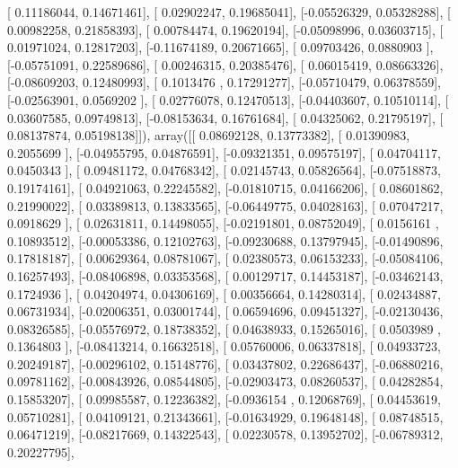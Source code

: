 \documentclass{article}
\begin{document}
       [ 0.11186044,  0.14671461],
       [ 0.02902247,  0.19685041],
       [-0.05526329,  0.05328288],
       [ 0.00982258,  0.21858393],
       [ 0.00784474,  0.19620194],
       [-0.05098996,  0.03603715],
       [ 0.01971024,  0.12817203],
       [-0.11674189,  0.20671665],
       [ 0.09703426,  0.0880903 ],
       [-0.05751091,  0.22589686],
       [ 0.00246315,  0.20385476],
       [ 0.06015419,  0.08663326],
       [-0.08609203,  0.12480993],
       [ 0.1013476 ,  0.17291277],
       [-0.05710479,  0.06378559],
       [-0.02563901,  0.0569202 ],
       [ 0.02776078,  0.12470513],
       [-0.04403607,  0.10510114],
       [ 0.03607585,  0.09749813],
       [-0.08153634,  0.16761684],
       [ 0.04325062,  0.21795197],
       [ 0.08137874,  0.05198138]]), array([[ 0.08692128,  0.13773382],
       [ 0.01390983,  0.2055699 ],
       [-0.04955795,  0.04876591],
       [-0.09321351,  0.09575197],
       [ 0.04704117,  0.0450343 ],
       [ 0.09481172,  0.04768342],
       [ 0.02145743,  0.05826564],
       [-0.07518873,  0.19174161],
       [ 0.04921063,  0.22245582],
       [-0.01810715,  0.04166206],
       [ 0.08601862,  0.21990022],
       [ 0.03389813,  0.13833565],
       [-0.06449775,  0.04028163],
       [ 0.07047217,  0.0918629 ],
       [ 0.02631811,  0.14498055],
       [-0.02191801,  0.08752049],
       [ 0.0156161 ,  0.10893512],
       [-0.00053386,  0.12102763],
       [-0.09230688,  0.13797945],
       [-0.01490896,  0.17818187],
       [ 0.00629364,  0.08781067],
       [ 0.02380573,  0.06153233],
       [-0.05084106,  0.16257493],
       [-0.08406898,  0.03353568],
       [ 0.00129717,  0.14453187],
       [-0.03462143,  0.1724936 ],
       [ 0.04204974,  0.04306169],
       [ 0.00356664,  0.14280314],
       [ 0.02434887,  0.06731934],
       [-0.02006351,  0.03001744],
       [ 0.06594696,  0.09451327],
       [-0.02130436,  0.08326585],
       [-0.05576972,  0.18738352],
       [ 0.04638933,  0.15265016],
       [ 0.0503989 ,  0.1364803 ],
       [-0.08413214,  0.16632518],
       [ 0.05760006,  0.06337818],
       [ 0.04933723,  0.20249187],
       [-0.00296102,  0.15148776],
       [ 0.03437802,  0.22686437],
       [-0.06880216,  0.09781162],
       [-0.00843926,  0.08544805],
       [-0.02903473,  0.08260537],
       [ 0.04282854,  0.15853207],
       [ 0.09985587,  0.12236382],
       [-0.0936154 ,  0.12068769],
       [ 0.04453619,  0.05710281],
       [ 0.04109121,  0.21343661],
       [-0.01634929,  0.19648148],
       [ 0.08748515,  0.06471219],
       [-0.08217669,  0.14322543],
       [ 0.02230578,  0.13952702],
       [-0.06789312,  0.20227795],
\end{document}
